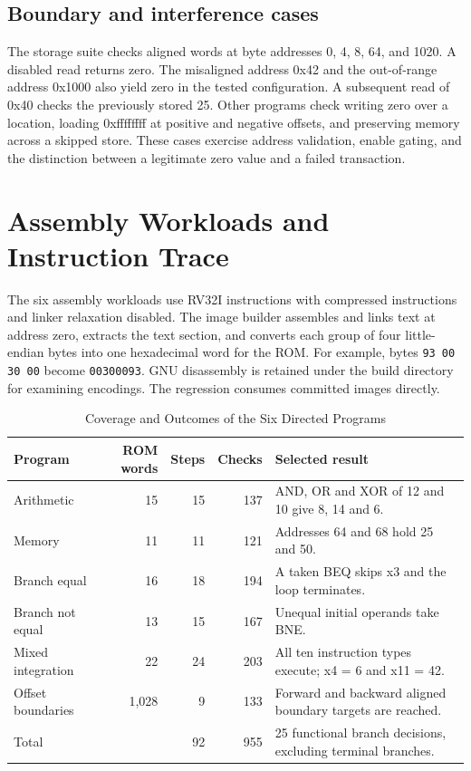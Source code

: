 \documentclass[conference,letterpaper]{IEEEtran}
\begin{document}
\subsection{Boundary and interference cases}
The storage suite checks aligned words at byte addresses 0, 4, 8, 64, and 1020. A disabled read returns zero. The misaligned address 0x42 and the out-of-range address 0x1000 also yield zero in the tested configuration. A subsequent read of 0x40 checks the previously stored 25. Other programs check writing zero over a location, loading 0xffffffff at positive and negative offsets, and preserving memory across a skipped store. These cases exercise address validation, enable gating, and the distinction between a legitimate zero value and a failed transaction.

\clearpage
\section{Assembly Workloads and Instruction Trace}\label{app:assembly}
The six assembly workloads use RV32I instructions with compressed instructions and linker relaxation disabled. The image builder assembles and links text at address zero, extracts the text section, and converts each group of four little-endian bytes into one hexadecimal word for the ROM. For example, bytes \texttt{93 00 30 00} become \texttt{00300093}. GNU disassembly is retained under the build directory for examining encodings. The regression consumes committed images directly.

\begin{table}[!ht]\centering
\caption{Coverage and Outcomes of the Six Directed Programs}
\begin{tabularx}{.98\linewidth}{@{}lrrrY@{}}\toprule
Program & ROM words & Steps & Checks & Selected result\\\midrule
Arithmetic & 15 & 15 & 137 & AND, OR and XOR of 12 and 10 give 8, 14 and 6.\\
Memory & 11 & 11 & 121 & Addresses 64 and 68 hold 25 and 50.\\
Branch equal & 16 & 18 & 194 & A taken BEQ skips x3 and the loop terminates.\\
Branch not equal & 13 & 15 & 167 & Unequal initial operands take BNE.\\
Mixed integration & 22 & 24 & 203 & All ten instruction types execute; x4 = 6 and x11 = 42.\\
Offset boundaries & 1,028 & 9 & 133 & Forward and backward aligned boundary targets are reached.\\\midrule
Total & & 92 & 955 & 25 functional branch decisions, excluding terminal branches.\\\bottomrule
\end{tabularx}\end{table}
\end{document}
